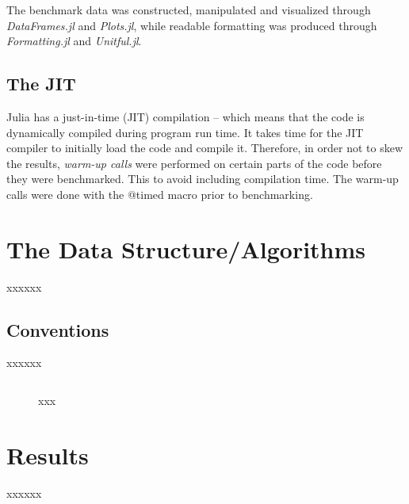 \documentclass[a4paper, 11pt]{article}
\begin{document}
    The benchmark data was constructed, manipulated and visualized through
    \emph{DataFrames.jl} and \emph{Plots.jl}, 
    while readable formatting was produced through 
    \emph{Formatting.jl} and \emph{Unitful.jl}. 

    \subsection*{The JIT}
    Julia has a just-in-time (JIT) compilation -- which means that the code is
    dynamically compiled during program run time.     
    It takes time for the JIT compiler to 
    initially load the code and compile it. Therefore, in order not to skew the
    results, \emph{warm-up calls} were performed on certain parts of the code
    before they were benchmarked. This to avoid including 
    compilation time. The warm-up calls were done with the @timed macro prior to
    benchmarking.

    \section*{The Data Structure/Algorithms} %
    xxxxxx
    \subsection*{Conventions}
    xxxxxx

    \begin{figure}[h]
        \centering
    \begin{verbatim}

    \end{verbatim}
    \caption{xxx} %
    \label{code:xxx} %
    \end{figure}

    \section*{Results}
    \label{sec:results}
    xxxxxx

\end{document}
